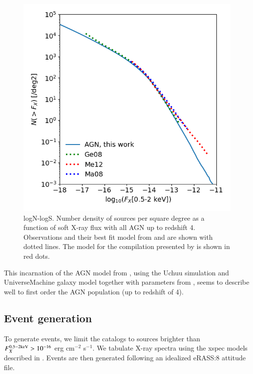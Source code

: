 \documentclass[twocolumn,iop]{openjournal}
\begin{document}
\begin{figure}
    \centering
    \includegraphics[width=0.95\linewidth]{figures_AGN/logNlogS_AGN_zupto4.png}
    \caption{logN-logS. Number density of sources per square degree as a function of soft X-ray flux with all AGN up to redshift 4. 
    Observations and their best fit model from \citet[][Ma08]{MateosWarwickCarrera2008A&A...492...51M} and  \citet[][Ge08]{GeorgakakisNandraLaird_2008MNRAS.388.1205G} are shown with dotted lines. 
    The model for the compilation presented by \citet[][Me12]{MerloniPredehlBecker_2012arXiv1209.3114M} is shown in red dots. 
    }
    \label{fig:AGN:logNlogS}
\end{figure}

This incarnation of the AGN model from \citet{ComparatMerloniSalvato_2019MNRAS.487.2005C}, using the Uchuu simulation and UniverseMachine galaxy model together with parameters from \citet{ComparatLuoMerloni_2023A&A...673A.122C}, seems to describe well to first order the AGN population (up to redshift of 4).  

\subsection*{Event generation}
To generate events, we limit the catalogs to sources brighter than $F^{\rm 0.5-2 keV}_X>10^{-16}$ erg cm$^{-2}$ s$^{-1}$. 
We tabulate X-ray spectra using the xspec models described in \citet{LiuMerloniComparat_2022A&A...661A..27L}. 
Events are then generated following an idealized eRASS:8 attitude file.
\end{document}
